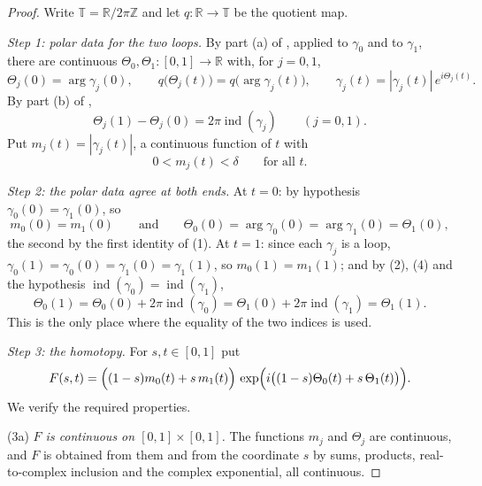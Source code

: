 \begin{proof}
Write $\mathbb{T}=\mathbb{R}/2\pi\mathbb{Z}$ and let
$q\colon\mathbb{R}\to\mathbb{T}$ be the quotient map.

\emph{Step 1: polar data for the two loops.}  By part (a) of
, applied to $\gamma_0$ and to $\gamma_1$, there are
continuous $\Theta_0,\Theta_1\colon[0,1]\to\mathbb{R}$ with, for $j=0,1$,
\begin{equation}\tag{1}
  \Theta_j(0)=\arg\gamma_j(0),\qquad
  q\bigl(\Theta_j(t)\bigr)=q\bigl(\arg\gamma_j(t)\bigr),\qquad
  \gamma_j(t)=|\gamma_j(t)|\,e^{i\Theta_j(t)} .
\end{equation}
By part (b) of ,
\begin{equation}\tag{2}
  \Theta_j(1)-\Theta_j(0)=2\pi\operatorname{ind}(\gamma_j)\qquad(j=0,1).
\end{equation}
Put $m_j(t)=|\gamma_j(t)|$, a continuous function of $t$ with
\begin{equation}\tag{3}
  0<m_j(t)<\delta\qquad\text{for all }t .
\end{equation}

\emph{Step 2: the polar data agree at both ends.}  At $t=0$: by hypothesis
$\gamma_0(0)=\gamma_1(0)$, so
\begin{equation}\tag{4}
  m_0(0)=m_1(0)\qquad\text{and}\qquad \Theta_0(0)=\arg\gamma_0(0)=\arg\gamma_1(0)=\Theta_1(0),
\end{equation}
the second by the first identity of (1).  At $t=1$: since each $\gamma_j$ is a
loop, $\gamma_0(1)=\gamma_0(0)=\gamma_1(0)=\gamma_1(1)$, so $m_0(1)=m_1(1)$;
and by (2), (4) and the hypothesis
$\operatorname{ind}(\gamma_0)=\operatorname{ind}(\gamma_1)$,
\begin{equation}\tag{5}
  \Theta_0(1)=\Theta_0(0)+2\pi\operatorname{ind}(\gamma_0)
  =\Theta_1(0)+2\pi\operatorname{ind}(\gamma_1)=\Theta_1(1).
\end{equation}
This is the only place where the equality of the two indices is used.

\emph{Step 3: the homotopy.}  For $s,t\in[0,1]$ put
\[
  F(s,t)=\Bigl((1-s)m_0(t)+s\,m_1(t)\Bigr)\,
    \exp\Bigl(i\bigl((1-s)\Theta_0(t)+s\,\Theta_1(t)\bigr)\Bigr).
\]
We verify the required properties.

(3a) \emph{$F$ is continuous on $[0,1]\times[0,1]$.}  The functions $m_j$ and
$\Theta_j$ are continuous, and $F$ is obtained from them and from the
coordinate $s$ by sums, products, real-to-complex inclusion and the complex
exponential, all continuous.


\end{proof}
